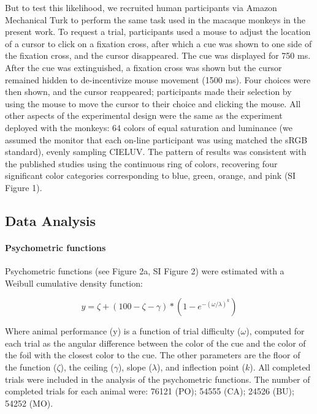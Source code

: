 \documentclass[9pt,biorxiv,lineno,onehalfspacing]{lapreprint}
\begin{document}
\begin{refsection}
But to test this likelihood, we recruited human participants via Amazon Mechanical Turk to perform the same task used in the macaque monkeys in the present work. 
To request a trial, participants used a mouse to adjust the location of a cursor to click on a fixation cross, after which a cue was shown to one side of the fixation cross, and the cursor disappeared. 
The cue was displayed for 750 ms. 
After the cue was extinguished, a fixation cross was shown but the cursor remained hidden to de-incentivize mouse movement (1500 ms). 
Four choices were then shown, and the cursor reappeared; participants made their selection by using the mouse to move the cursor to their choice and clicking the mouse. 
All other aspects of the experimental design were the same as the experiment deployed with the monkeys: 64 colors of equal saturation and luminance (we assumed the monitor that each on-line participant was using matched the sRGB standard), evenly sampling CIELUV. 
The pattern of results was consistent with the published studies using the continuous ring of colors, recovering four significant color categories corresponding to blue, green, orange, and pink (SI Figure 1). %

\subsection{Data Analysis}

\paragraph{Psychometric functions}

Psychometric functions (see Figure 2a, SI Figure 2) were estimated with a Weibull cumulative density function: %

\begin{equation} \label{eq:Weibull}
    y=\zeta+(100-\zeta-\gamma) *\left(1-e^{-(\omega / \lambda)^k}\right) 
\end{equation}

Where animal performance (y) is a function of trial difficulty ($\omega$), computed for each trial as the angular difference between the color of the cue and the color of the foil with the closest color to the cue. 
The other parameters are the floor of the function ($\zeta$), the ceiling ($\gamma$), slope ($\lambda$), and inflection point ($k$). 
All completed trials were included in the analysis of the psychometric functions. 
The number of completed trials for each animal were: 76121 (PO); 54555 (CA); 24526 (BU); 54252 (MO). 


\end{refsection}
\end{document}
